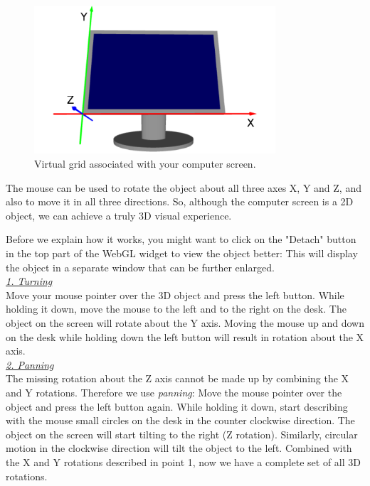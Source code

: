 \begin{figure}[!ht]
\begin{center}
\includegraphics[width=0.8\textwidth]{img/monitor.png}
\end{center}
\vspace{-4mm}
\caption{Virtual grid associated with your computer screen.}
\label{fig:monitor}
\end{figure}
\noindent
The mouse can be used to rotate the object about all three axes X, Y and 
Z, and also to move it in all three directions. So, although the 
computer screen is a 2D object, we can achieve a truly 3D visual experience. 

Before we explain how it works, you might want to click on the "Detach" button in 
the top part of the WebGL widget to view the object better: This will 
display the object in a separate window that can be further enlarged. \\

\noindent
\underline{\em 1. Turning}\\

\noindent
Move your mouse pointer over the 3D object and press the left button. 
While holding it down, move the mouse to the left and to the right on the desk. 
The object on the screen will rotate about the Y axis. Moving the mouse up and down 
on the desk while holding down the left button will result in rotation 
about the X axis.\\

\noindent
\underline{\em 2. Panning}\\

\noindent
The missing rotation about the Z axis cannot be made up by combining 
the X and Y rotations. Therefore we use {\em panning}: Move the mouse 
pointer over the object and press the left button again. While holding 
it down, start describing with the mouse small circles on the desk 
in the counter clockwise direction. The object on the screen will start 
tilting to the right (Z rotation). Similarly, circular motion in the 
clockwise direction will tilt the object to the left. Combined with the 
X and Y rotations described in point 1, now we have a complete set of all
3D rotations.\\

